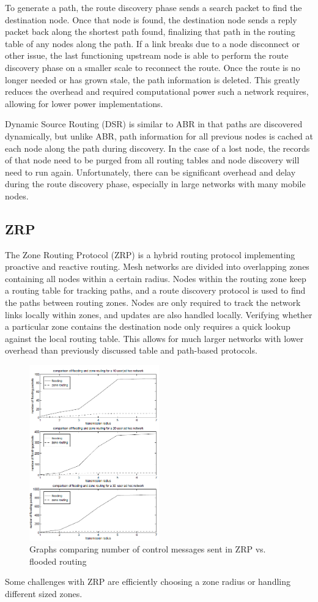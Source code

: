 \documentclass[conference]{IEEEtran}
\begin{document}
To generate a path, the route discovery phase sends a search packet to find the destination node. Once that node is found, the destination node sends a reply packet back along the shortest path found, finalizing that path 
in the routing table of any nodes along the path.  If a link breaks due to a node disconnect or other issue, the last functioning upstream node is able to perform the route discovery phase on a smaller scale to reconnect the 
route.  Once the route is no longer needed or has grown stale, the path information is deleted.  This greatly reduces the overhead and required computational power such a network requires, allowing for lower power implementations.

Dynamic Source Routing (DSR) is similar to ABR in that paths are discovered dynamically, but unlike ABR, path information for all previous nodes is cached at each node along the path during discovery.  In the case of a lost node, the records 
of that node need to be purged from all routing tables and node discovery will need to run again\cite{johnson_2007}.  Unfortunately, there can be significant overhead and delay during the route discovery phase, especially in large networks with many mobile nodes.
\subsection{ZRP}
The Zone Routing Protocol (ZRP) is a hybrid routing protocol implementing proactive and reactive routing. Mesh networks are divided into overlapping zones containing all nodes within a certain radius. Nodes within the routing zone keep a routing
table for tracking paths, and a route discovery protocol is used to find the paths between routing zones. Nodes are only required to track the network links locally within zones, and updates are also handled locally.  Verifying whether a particular
zone contains the destination node only requires a quick lookup against the local routing table\cite{haas}.  This allows for much larger networks with lower overhead than previously discussed table and path-based protocols.  
\begin{figure}[htbp]
    \includegraphics[width=0.5\textwidth]{ZRP.png}
    \caption{Graphs comparing number of control messages sent in ZRP vs. flooded routing \cite{haas}}
\end{figure}
Some challenges with ZRP are efficiently choosing a zone radius or handling different sized zones.
\end{document}

